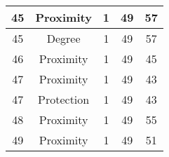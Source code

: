 \documentclass[results.tex]{subfiles}
\begin{document}
\begin{center}
\begin{tabular}{| c || c | c | c | c |}
    \hline
    45 & Proximity & 1 & 49 & 57 \\ 
    \hline
    45 & Degree & 1 & 49 & 57 \\ 
    \hline
    46 & Proximity & 1 & 49 & 45 \\ 
    \hline
    47 & Proximity & 1 & 49 & 43 \\ 
    \hline
    47 & Protection & 1 & 49 & 43 \\ 
    \hline
    48 & Proximity & 1 & 49 & 55 \\ 
    \hline
    49 & Proximity & 1 & 49 & 51 \\ 
    \hline   \end{tabular}
\end{center}
\end{document}
